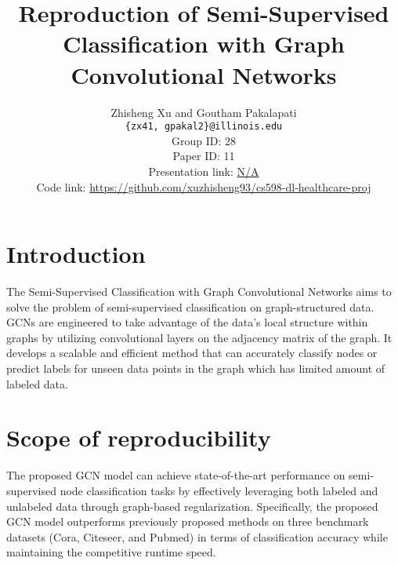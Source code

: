 \documentclass[11pt,a4paper]{article}
\title{Reproduction of Semi-Supervised Classification with Graph Convolutional Networks}
\author{Zhisheng Xu and Goutham Pakalapati\\
  \texttt{\{zx41, gpakal2\}@illinois.edu}
  \\[2em]
  Group ID: 28\\
  Paper ID: 11\\
  Presentation link: \url{N/A} \\
  Code link: \url{https://github.com/xuzhisheng93/cs598-dl-healthcare-proj}
}
\begin{document}
\maketitle


\section{Introduction}

The Semi-Supervised Classification with Graph Convolutional Networks \cite{kipf2017semi} aims to solve the problem of semi-supervised classification on graph-structured data. GCNs are engineered to take advantage of the data's local structure within graphs by utilizing convolutional layers on the adjacency matrix of the graph. It develops a scalable and efficient method that can accurately classify nodes or predict labels for unseen data points in the graph which has limited amount of labeled data.

\section{Scope of reproducibility}

The proposed GCN model can achieve state-of-the-art performance on semi-supervised node classification tasks by effectively leveraging both labeled and unlabeled data through graph-based regularization. Specifically, the proposed GCN model outperforms previously proposed methods on three benchmark datasets (Cora, Citeseer, and Pubmed) in terms of classification accuracy while maintaining the competitive runtime speed.


\end{document}
